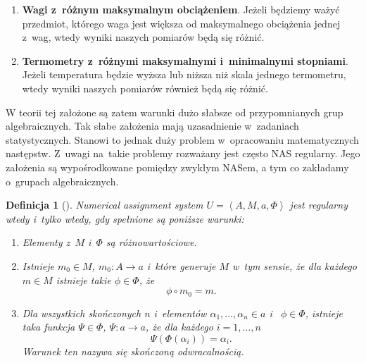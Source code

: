 \documentclass[12pt,a4paper]{report}
\newtheorem{definition}{Definicja}[chapter]
\newcommand{\tuple}[1]{\left\langle {#1} \right\rangle}
\begin{document}
\begin{enumerate}
\item
\textbf{Wagi z~różnym maksymalnym obciążeniem}. Jeżeli będziemy ważyć przedmiot, którego waga jest większa od maksymalnego obciążenia jednej z~wag, wtedy wyniki naszych pomiarów będą się różnić. 
\item
\textbf{Termometry z~różnymi maksymalnymi i~minimalnymi stopniami}. Jeżeli temperatura będzie wyższa lub niższa niż skala jednego termometru, wtedy wyniki naszych pomiarów również będą się różnić.
\end{enumerate}  
W teorii tej założone są zatem warunki dużo słabsze od przypomnianych grup algebraicznych. Tak słabe założenia mają uzasadnienie w~zadaniach statystycznych. Stanowi to jednak duży problem w~opracowaniu matematycznych następstw. Z~uwagi na~takie problemy rozważany jest często NAS regularny. Jego założenia są wypośrodkowane pomiędzy zwykłym NASem, a tym co zakładamy o~grupach algebraicznych.  
\begin{definition}[{\citep[Def. 2]{adams1965theory}}]
Numerical assignment system $U=\tuple{A, M, a, \Phi}$ jest regularny wtedy i~tylko wtedy, gdy spełnione są poniższe warunki:
\begin{enumerate}
\item
Elementy z~$M$ i~$\Phi$ są różnowartościowe.
\item
Istnieje $m_{0}\in M$, $m_0:A\to a$ i~które generuje $M$ w~tym sensie, że dla każdego $m\in M$ istnieje takie $\phi\in \Phi$, że
$$
\phi \circ m_{0}=m.
$$
\item
Dla wszystkich skończonych $n$ i~elementów $\alpha_{1},\dots,\alpha_{n}\in a$ i~ $\phi\in \Phi$, istnieje taka funkcja $\Psi\in \Phi$, $\Psi:a\to a$, że dla każdego $i=1,\ldots,n$ 
$$
\Psi(\Phi(\alpha_{i}))=\alpha_{i}.
$$
Warunek ten nazywa się skończoną odwracalnością.
\end{enumerate}
\end{definition}
\end{document}
